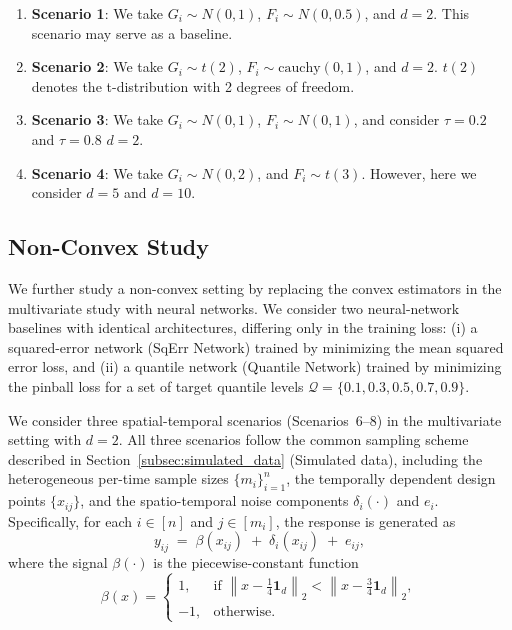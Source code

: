 \documentclass[twoside,11pt]{article}
\begin{document}
\begin{enumerate}
    
\item \textbf{Scenario 1}: We take $G_i\sim N(0, 1)$, $F_i\sim N(0, 0.5)$, and $d=2$. This scenario may serve as a baseline. 

\item \textbf{Scenario 2}: We take $G_i\sim t(2)$, $F_i\sim \text{cauchy}(0, 1)$, and $d=2$. $t(2)$ denotes the t-distribution with 2 degrees of freedom. 

\item \textbf{Scenario 3}: We take $G_i\sim N(0, 1)$, $F_i\sim N(0, 1)$, and consider $\tau = 0.2$ and $\tau = 0.8$ $d=2$. 


\item \textbf{Scenario 4}: We take $G_i\sim N(0, 2)$, and $F_i\sim t(3)$. However, here we consider $d = 5$ and $d = 10$. 

\end{enumerate}


\subsection{Non-Convex Study}

We further study a non-convex setting by replacing the convex estimators in the multivariate study with neural networks. 
We consider two neural-network baselines with identical architectures, differing only in the training loss:
(i) a squared-error network (SqErr Network) trained by minimizing the mean squared error loss, and 
(ii) a quantile network (Quantile Network) trained by minimizing the pinball loss for a set of target quantile levels 
$\mathcal{Q}=\{0.1,0.3,0.5,0.7,0.9\}$.


We consider three spatial-temporal scenarios (Scenarios~6--8) in the multivariate setting with $d=2$.
All three scenarios follow the common sampling scheme described in Section~\ref{subsec:simulated_data} (Simulated data), 
including the heterogeneous per-time sample sizes $\{m_i\}_{i=1}^n$, the temporally dependent design points $\{x_{ij}\}$, 
and the spatio-temporal noise components $\delta_i(\cdot)$ and $e_i$.
Specifically, for each $i\in[n]$ and $j\in[m_i]$, the response is generated as
\begin{equation}\label{eq:st_yij}
y_{ij} \;=\; \beta(x_{ij}) \;+\; \delta_i(x_{ij}) \;+\; e_{ij},
\end{equation}
where the signal $\beta(\cdot)$ is the piecewise-constant function
\begin{equation}\label{eq:st_beta_piecewise}
\beta(x)=
\begin{cases}
1, & \text{if } \left\|x-\frac14\mathbf{1}_d\right\|_2 < \left\|x-\frac34\mathbf{1}_d\right\|_2,\\
-1, & \text{otherwise}.
\end{cases}
\end{equation}
\end{document}
